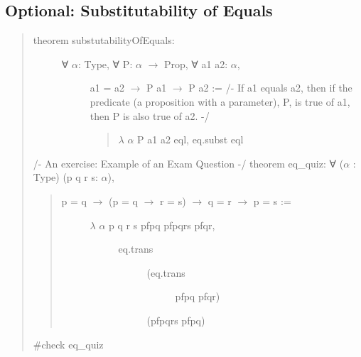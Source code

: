 \documentclass[letterpaper,10pt,english]{sphinxmanual}
\begin{document}
\subsection{Optional: Substitutability of Equals}
\label{\detokenize{16-equality:optional-substitutability-of-equals}}\begin{quote}
\begin{description}
\item[{theorem substutabilityOfEquals:}] \leavevmode\begin{description}
\item[{∀ \(\alpha\): Type, ∀ P: \(\alpha\) \(\rightarrow\) Prop, ∀ a1 a2: \(\alpha\),}] \leavevmode
a1 = a2 \(\rightarrow\) P a1 \(\rightarrow\) P a2 :=
/-
If a1 equals a2, then if the predicate
(a proposition with a parameter), P, is
true of a1, then P is also true of a2.
-/
\begin{quote}

\(\lambda\) \(\alpha\) P a1 a2 eql, eq.subst eql
\end{quote}

\end{description}

\end{description}

/- An exercise: Example of an Exam Question -/
theorem eq\_quiz: ∀ (\(\alpha\) : Type) (p q r s: \(\alpha\)),
\begin{quote}
\begin{description}
\item[{p = q \(\rightarrow\) (p = q \(\rightarrow\) r = s) \(\rightarrow\) q = r \(\rightarrow\) p = s :=}] \leavevmode\begin{description}
\item[{\(\lambda\) \(\alpha\) p q r s pfpq pfpqrs pfqr,}] \leavevmode\begin{description}
\item[{eq.trans}] \leavevmode\begin{description}
\item[{(eq.trans}] \leavevmode
pfpq
pfqr)

\end{description}

(pfpqrs pfpq)

\end{description}

\end{description}

\end{description}
\end{quote}

\#check eq\_quiz
\end{quote}
\end{document}
